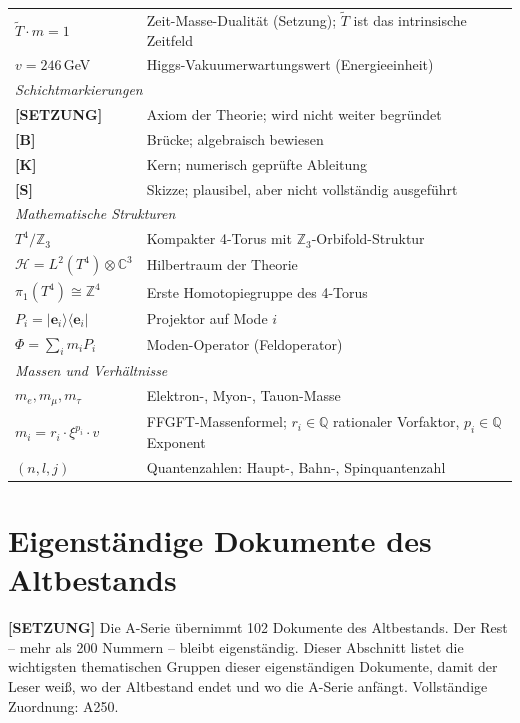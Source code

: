 {\begin{longtable}{lp{\dimexpr\textwidth-3.2cm\relax}}
$\tilde T\cdot m = 1$ & Zeit-Masse-Dualität (Setzung); $\tilde T$ ist das
  intrinsische Zeitfeld \\
$v = 246\,$GeV & Higgs-Vakuumerwartungswert (Energieeinheit) \\
\midrule
\multicolumn{2}{l}{\textit{Schichtmarkierungen}} \\
\textbf{[SETZUNG]} & Axiom der Theorie; wird nicht weiter begründet \\
\textbf{[B]} & Brücke; algebraisch bewiesen \\
\textbf{[K]} & Kern; numerisch geprüfte Ableitung \\
\textbf{[S]} & Skizze; plausibel, aber nicht vollständig ausgeführt \\
\midrule
\multicolumn{2}{l}{\textit{Mathematische Strukturen}} \\
$T^4/\mathbb{Z}_3$ & Kompakter 4-Torus mit $\mathbb{Z}_3$-Orbifold-Struktur \\
$\mathcal{H} = L^2(T^4)\otimes\mathbb{C}^3$ & Hilbertraum der Theorie \\
$\pi_1(T^4)\cong\mathbb{Z}^4$ & Erste Homotopiegruppe des 4-Torus \\
$P_i = |\mathbf{e}_i\rangle\langle\mathbf{e}_i|$ & Projektor auf Mode $i$ \\
$\Phi = \sum_i m_i P_i$ & Moden-Operator (Feldoperator) \\
\midrule
\multicolumn{2}{l}{\textit{Massen und Verhältnisse}} \\
$m_e, m_\mu, m_\tau$ & Elektron-, Myon-, Tauon-Masse \\
$m_i = r_i\cdot\xi^{p_i}\cdot v$ & FFGFT-Massenformel; $r_i\in\mathbb{Q}$
  rationaler Vorfaktor, $p_i\in\mathbb{Q}$ Exponent \\
$(n, l, j)$ & Quantenzahlen: Haupt-, Bahn-, Spinquantenzahl \\
\end{longtable}
}
\renewcommand{\arraystretch}{1.0}

\section{Eigenständige Dokumente des Altbestands}

\textbf{[SETZUNG]} Die A-Serie übernimmt 102 Dokumente des Altbestands. Der
Rest -- mehr als 200 Nummern -- bleibt eigenständig. Dieser Abschnitt listet
die wichtigsten thematischen Gruppen dieser eigenständigen Dokumente, damit der
Leser weiß, wo der Altbestand endet und wo die A-Serie anfängt. Vollständige
Zuordnung: A250.


